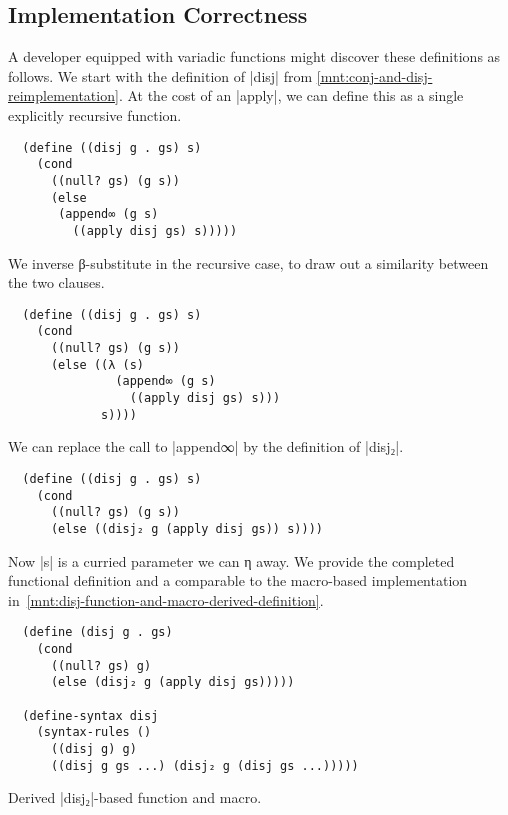 \documentclass[sigplan,screen,draft,anonymous,review,natbib=false]{acmart}
\begin{document}
\subsection{Implementation Correctness}

A developer equipped with variadic functions might discover these
definitions as follows. We start with the definition of
\rackinline|disj| from \cref{mnt:conj-and-disj-reimplementation}. At
the cost of an \rackinline|apply|, we can define this as a single
explicitly recursive function.

\begin{verbatim}
  (define ((disj g . gs) s)
    (cond
      ((null? gs) (g s))
      (else
       (append∞ (g s)
         ((apply disj gs) s)))))
\end{verbatim}

We inverse β-substitute in the recursive case, to draw out a
similarity between the two clauses.

\begin{listing}
\begin{verbatim}
  (define ((disj g . gs) s)
    (cond
      ((null? gs) (g s))
      (else ((λ (s)
               (append∞ (g s)
                 ((apply disj gs) s)))
             s))))
\end{verbatim}
\end{listing}

We can replace the call to \rackinline|append∞| by the definition
of \rackinline|disj₂|.

\begin{verbatim}
  (define ((disj g . gs) s)
    (cond
      ((null? gs) (g s))
      (else ((disj₂ g (apply disj gs)) s))))
\end{verbatim}

Now \rackinline|s| is a curried parameter we can η away.
We provide the completed functional definition and a comparable to the
macro-based implementation
in~\cref{mnt:disj-function-and-macro-derived-definition}.

\begin{listing}
\begin{verbatim}
  (define (disj g . gs)
    (cond
      ((null? gs) g)
      (else (disj₂ g (apply disj gs)))))

  (define-syntax disj
    (syntax-rules ()
      ((disj g) g)
      ((disj g gs ...) (disj₂ g (disj gs ...)))))
\end{verbatim}
  \caption{Derived \rackinline|disj₂|-based function and macro.}
  \label{mnt:disj-function-and-macro-derived-definition}
\end{listing}
\end{document}
